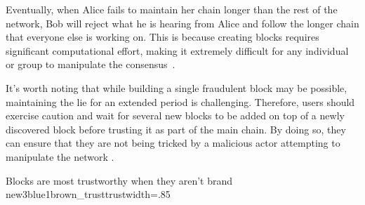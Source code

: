 Eventually, when Alice fails to maintain her chain longer than the rest of the network, Bob will reject what he is hearing from Alice and follow the longer chain that everyone else is working on. This is because creating blocks requires significant computational effort, making it extremely difficult for any individual or group to manipulate the consensus~\cite{szabo2005bit}.

It's worth noting that while building a single fraudulent block may be possible, maintaining the lie for an extended period is challenging. Therefore, users should exercise caution and wait for several new blocks to be added on top of a newly discovered block before trusting it as part of the main chain. By doing so, they can ensure that they are not being tricked by a malicious actor attempting to manipulate the network \cite{dupont2019cryptocurrencies}.

{Blocks are most trustworthy when they aren't brand new}{3blue1brown_trust}{trust}{width=.85\textwidth}%
